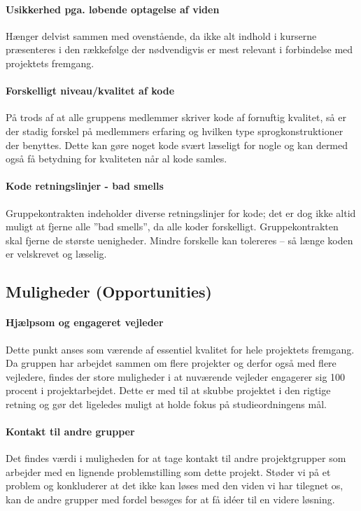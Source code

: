 \paragraph{Usikkerhed pga. løbende optagelse af viden}\label{swot:optagelse_af_viden}
Hænger delvist sammen med ovenstående, da ikke alt indhold i kurserne præsenteres i den rækkefølge der nødvendigvis er mest relevant i forbindelse med projektets fremgang.

\paragraph{Forskelligt niveau/kvalitet af kode}\label{swot:niveau_af_kode}
På trods af at alle gruppens medlemmer skriver kode af fornuftig kvalitet, så er der stadig forskel på medlemmers erfaring og hvilken type sprogkonstruktioner der benyttes.
Dette kan gøre noget kode svært læseligt for nogle og kan dermed også få betydning for kvaliteten når al kode samles.

\paragraph{Kode retningslinjer - bad smells}\label{swot:bad_smells}
Gruppekontrakten indeholder diverse retningslinjer for kode; det er dog ikke altid muligt at fjerne alle ''bad smells'', da alle koder forskelligt.
Gruppekontrakten skal fjerne de største uenigheder.
Mindre forskelle kan tolereres -- så længe koden er velskrevet og læselig.

\subsection{Muligheder \textnormal{(\textbf{O}pportunities)}}

\paragraph{Hjælpsom og engageret vejleder}
Dette punkt anses som værende af essentiel kvalitet for hele projektets fremgang. 
Da gruppen har arbejdet sammen om flere projekter og derfor også med flere vejledere, findes der store muligheder i at nuværende vejleder engagerer sig 100 procent i projektarbejdet.
Dette er med til at skubbe projektet i den rigtige retning og gør det ligeledes muligt at holde fokus på studieordningens mål.

\paragraph{Kontakt til andre grupper}
Det findes værdi i muligheden for at tage kontakt til andre projektgrupper som arbejder med en lignende problemstilling som dette projekt.
Støder vi på et problem og konkluderer at det ikke kan løses med den viden vi har tilegnet os, kan de andre grupper med fordel besøges for at få idéer til en videre løsning.

